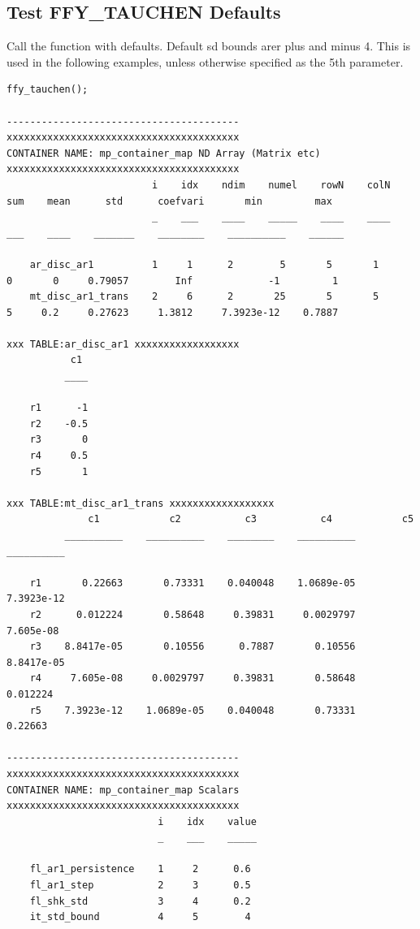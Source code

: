 \documentclass[
]{book}
\begin{document}
\hypertarget{test-ffy_tauchen-defaults}{%
\subsection{Test FFY\_TAUCHEN Defaults}\label{test-ffy_tauchen-defaults}}

Call the function with defaults. Default sd bounds arer plus and minus
4. This is used in the following examples, unless otherwise specified as
the 5th parameter.

\begin{verbatim}
ffy_tauchen();

----------------------------------------
xxxxxxxxxxxxxxxxxxxxxxxxxxxxxxxxxxxxxxxx
CONTAINER NAME: mp_container_map ND Array (Matrix etc)
xxxxxxxxxxxxxxxxxxxxxxxxxxxxxxxxxxxxxxxx
                         i    idx    ndim    numel    rowN    colN    sum    mean      std      coefvari       min         max  
                         _    ___    ____    _____    ____    ____    ___    ____    _______    ________    __________    ______

    ar_disc_ar1          1     1      2        5       5       1       0       0     0.79057        Inf             -1         1
    mt_disc_ar1_trans    2     6      2       25       5       5       5     0.2     0.27623     1.3812     7.3923e-12    0.7887

xxx TABLE:ar_disc_ar1 xxxxxxxxxxxxxxxxxx
           c1 
          ____

    r1      -1
    r2    -0.5
    r3       0
    r4     0.5
    r5       1

xxx TABLE:mt_disc_ar1_trans xxxxxxxxxxxxxxxxxx
              c1            c2           c3           c4            c5    
          __________    __________    ________    __________    __________

    r1       0.22663       0.73331    0.040048    1.0689e-05    7.3923e-12
    r2      0.012224       0.58648     0.39831     0.0029797     7.605e-08
    r3    8.8417e-05       0.10556      0.7887       0.10556    8.8417e-05
    r4     7.605e-08     0.0029797     0.39831       0.58648      0.012224
    r5    7.3923e-12    1.0689e-05    0.040048       0.73331       0.22663

----------------------------------------
xxxxxxxxxxxxxxxxxxxxxxxxxxxxxxxxxxxxxxxx
CONTAINER NAME: mp_container_map Scalars
xxxxxxxxxxxxxxxxxxxxxxxxxxxxxxxxxxxxxxxx
                          i    idx    value
                          _    ___    _____

    fl_ar1_persistence    1     2      0.6 
    fl_ar1_step           2     3      0.5 
    fl_shk_std            3     4      0.2 
    it_std_bound          4     5        4 
\end{verbatim}
\end{document}

